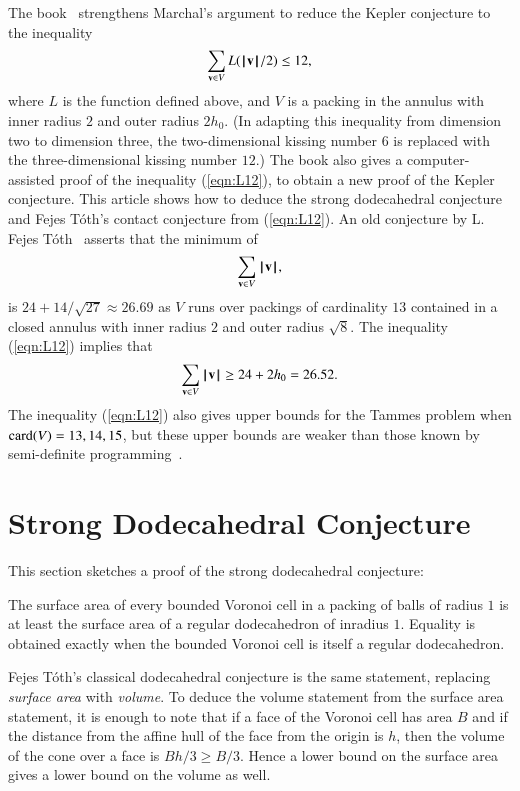 \documentclass{llncs}
\begin{document}
\begin{remark}
The book~\cite{DSP} strengthens Marchal's argument to reduce
the Kepler conjecture to the inequality
\begin{equation}\label{eqn:L12}
\sum_{{\mathbf v} \in V} L({{\hskip0.1em|\hskip-0.15em|\hskip0.1em}{\mathbf v}{\hskip0.1em|\hskip-0.15em|\hskip0.1em}}/2) \le 12,
\end{equation}
where $L$ is the function defined above, and $V$ is a packing in the
annulus with inner radius $2$ and outer radius $2h_0$.  (In adapting
this inequality from dimension two to dimension three, the
two-dimensional kissing number $6$ is replaced with the
three-dimensional kissing number $12$.) The book also gives a
computer-assisted proof of the inequality (\ref{eqn:L12}), to obtain a
new proof of the Kepler conjecture.  This article shows how to deduce
the strong dodecahedral conjecture and Fejes T\'oth's contact
conjecture from (\ref{eqn:L12}). An old conjecture by L. Fejes
T\'oth~\cite[p.~178]{Toth:1972:Lagerungen} asserts that the minimum of
\begin{equation}\label{eqn:FT}
\sum_{{\mathbf v}\in V} {{\hskip0.1em|\hskip-0.15em|\hskip0.1em}{\mathbf v}{\hskip0.1em|\hskip-0.15em|\hskip0.1em}},
\end{equation}
is $24+ 14/\sqrt{27}\approx 26.69$
as $V$ runs over packings of cardinality $13$ contained in a closed
annulus with inner radius $2$ and outer radius $\sqrt8$.  The
inequality (\ref{eqn:L12}) implies that
\begin{equation}\label{eqn:FT}
\sum_{{\mathbf v}\in V} {{\hskip0.1em|\hskip-0.15em|\hskip0.1em}{\mathbf v}{\hskip0.1em|\hskip-0.15em|\hskip0.1em}}\ge 24 + 2 h_0 = 26.52.
\end{equation}
The inequality (\ref{eqn:L12}) also gives upper bounds for the Tammes
problem when ${\operatorname{card}}(V)=13,14,15$, but these upper bounds are weaker
than those known by semi-definite programming~\cite{BV08}.
\end{remark}

\section{Strong Dodecahedral Conjecture}

This section sketches a proof of the strong dodecahedral conjecture:

\begin{theorem}
The surface area of every  bounded Voronoi cell in a packing of balls of radius $1$ is
at least the surface area of a regular dodecahedron of inradius $1$.  Equality is
obtained exactly when the bounded Voronoi cell is itself a regular dodecahedron.
\end{theorem}

\begin{remark} Fejes T\'oth's classical dodecahedral conjecture is the
  same statement, replacing {\it surface area} with {\it volume}.  To
  deduce the volume statement from the surface area statement, it is
  enough to note that if a face of the Voronoi cell has area $B$ and
  if the distance from the affine hull of the face from the origin is
  $h$, then the volume of the cone over a face is $B h/3 \ge B/3$.
  Hence a lower bound on the surface area gives a lower bound on the
  volume as well.
\end{remark}
\end{document}
